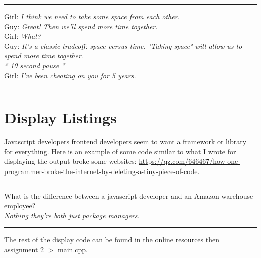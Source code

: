 \documentclass[letterpaper, 10pt]{article}
\begin{document}
\vspace{.25cm}
\hrule
\vspace{.25cm}
\noindent
Girl: \textit{I think we need to take some space from each other.}\\
Guy: \textit{Great! Then we'll spend more time together.}\\
Girl: \textit{What?}\\
Guy: \textit{It's a classic tradeoff: space versus time. "Taking space" will allow us to spend more time together}.\\
\textit{* 10 second pause *}\\
Girl: \textit{I've been cheating on you for 5 years.}\\
\hrule
\vspace{1cm}
\newpage
\section{Display Listings}
Javascript developers frontend developers seem to want a framework or library for everything.
Here is an example of some code similar to what I wrote for displaying the output broke
some websites: 
\url{https://qz.com/646467/how-one-programmer-broke-the-internet-by-deleting-a-tiny-piece-of-code.}

\vspace{.25cm}
\hrule
\vspace{.25cm}
\noindent
What is the difference between a javascript developer and an Amazon warehouse employee? \\ 
\textit{Nothing they're both just package managers.}\\
\hrule
\vspace{1cm}
\noindent
The rest of the display code can be found in the online resources then \\assignment 2 $>$ main.cpp.
\end{document}
